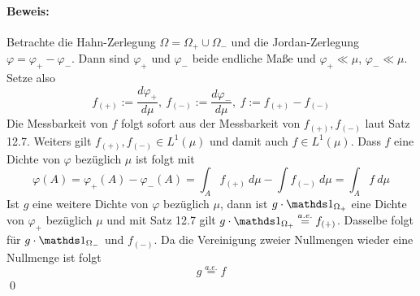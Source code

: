      \paragraph{Beweis:}Betrachte die Hahn-Zerlegung $\Omega=\Omega_+\cup\Omega_-$ und die Jordan-Zerlegung $\varphi=\varphi_+-\varphi_-$. Dann sind $\varphi_+$ und $\varphi_-$ beide endliche Maße und $\varphi_+\ll\mu$, $\varphi_-\ll\mu$. Setze also 
     $$f_{(+)}:=\dfrac{d\varphi_+}{d\mu},\ f_{(-)}:=\dfrac{d\varphi_-}{d\mu},\ f:=f_{(+)}-f_{(-)}$$
     Die Messbarkeit von $f$ folgt sofort aus der Messbarkeit von $f_{(+)},f_{(-)}$ laut Satz 12.7. Weiters gilt $f_{(+)},f_{(-)}\in L^1(\mu)$ und damit auch $f\in L^1(\mu)$. Dass $f$ eine Dichte von $\varphi$ bez\"uglich $\mu$ ist folgt mit
     $$\varphi(A)=\varphi_+(A)-\varphi_-(A)=\int_A f_{(+)}\ d\mu-\int f_{(-)}\ d\mu=\int_A f\ d\mu$$
     Ist $g$ eine weitere Dichte von $\varphi$ bez\"uglich $\mu$, dann ist $g\cdot\ind{\Omega_+}$ eine Dichte von $\varphi_+$ bez\"uglich $\mu$ und mit Satz 12.7 gilt $g\cdot\ind{\Omega_+}\overset{a.e.}{=}f_{(+)}$. Dasselbe folgt f\"ur $g\cdot\ind{\Omega_-}$ und $f_{(-)}$. Da die Vereinigung zweier Nullmengen wieder eine Nullmenge ist folgt
     $$g\overset{a.e.}{=}f$$
     \qed
